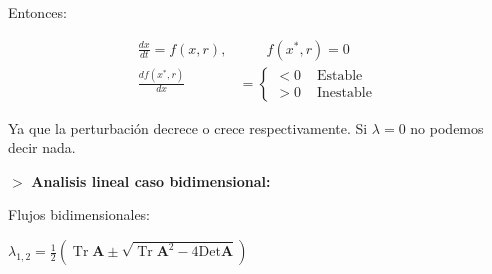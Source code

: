 \documentclass[%
 reprint,
 amsmath,amssymb,
 aps,
]{revtex4-1}
\begin{document}
Entonces:

$$
\begin{aligned}
\frac{d x}{d t}=f(x, r), & \qquad f\left(x^{*}, r\right)=0 \\
\frac{d f\left(x^{*}, r\right)}{d x} &=\left\{\begin{array}{ll}
<0 & \text { Estable } \\
>0 & \text { Inestable }
\end{array}\right.
\end{aligned}
$$

Ya que la perturbación decrece o crece respectivamente. Si $\lambda=0$ no podemos decir nada.


$>$ \textbf{Analisis lineal caso bidimensional:}

Flujos bidimensionales:

$\lambda_{1,2}=\frac{1}{2}\left(\operatorname{Tr} \mathbf{A} 
\pm 
\sqrt{\operatorname{Tr} \mathbf{A}^{2}-4 \mathrm{Det} \mathbf{A}  } \right)$
\end{document}
